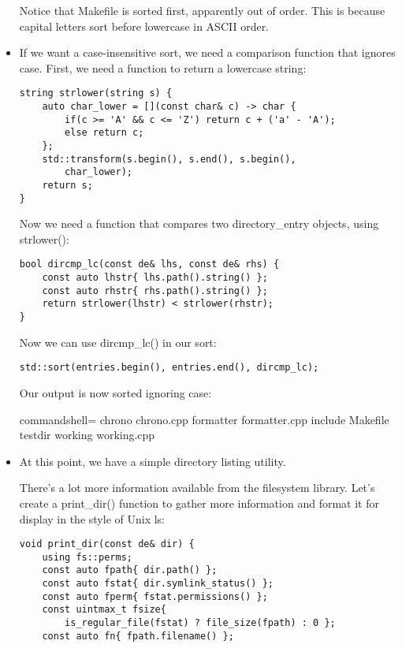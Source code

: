 \begin{itemize}
Notice that Makefile is sorted first, apparently out of order. This is because capital letters sort before lowercase in ASCII order.

\item 
If we want a case-insensitive sort, we need a comparison function that ignores case. First, we need a function to return a lowercase string:

\begin{lstlisting}[style=styleCXX]
string strlower(string s) {
	auto char_lower = [](const char& c) -> char {
		if(c >= 'A' && c <= 'Z') return c + ('a' - 'A');
		else return c;
	};
	std::transform(s.begin(), s.end(), s.begin(),
		char_lower);
	return s;
}
\end{lstlisting}

Now we need a function that compares two directory\_entry objects, using strlower():

\begin{lstlisting}[style=styleCXX]
bool dircmp_lc(const de& lhs, const de& rhs) {
	const auto lhstr{ lhs.path().string() };
	const auto rhstr{ rhs.path().string() };
	return strlower(lhstr) < strlower(rhstr);
}
\end{lstlisting}

Now we can use dircmp\_lc() in our sort:

\begin{lstlisting}[style=styleCXX]
std::sort(entries.begin(), entries.end(), dircmp_lc);
\end{lstlisting}

Our output is now sorted ignoring case:

\begin{tcblisting}{commandshell={}}
chrono chrono.cpp formatter formatter.cpp include
Makefile testdir working working.cpp
\end{tcblisting}

\item 
At this point, we have a simple directory listing utility.

There's a lot more information available from the filesystem library. Let's create a print\_dir() function to gather more information and format it for display in the style of Unix ls:

\begin{lstlisting}[style=styleCXX]
void print_dir(const de& dir) {
	using fs::perms;
	const auto fpath{ dir.path() };
	const auto fstat{ dir.symlink_status() };
	const auto fperm{ fstat.permissions() };
	const uintmax_t fsize{
		is_regular_file(fstat) ? file_size(fpath) : 0 };
	const auto fn{ fpath.filename() };
	

\end{lstlisting}
\end{itemize}

